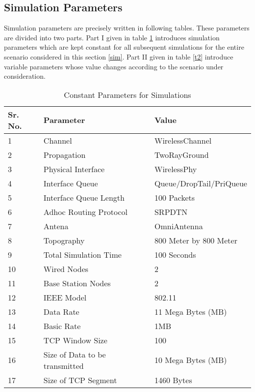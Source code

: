 \documentclass[3p,times]{elsarticle}
\begin{document}
\subsection{Simulation Parameters}\label{simpara}
Simulation parameters are precisely written in following tables. These parameters are divided into two parts. Part I given in table \ref{t1} introduces simulation parameters which are kept constant for all subsequent simulations for the entire scenario considered in this section \ref{sim}. Part II given in table \ref{t2} introduce variable parameters whose value changes according to the scenario under consideration.

\begin{table}[t]
\centering
\caption{Constant Parameters for Simulations}
\begin{tabular}{|l|l|l|}
\hline
Sr. No. & Parameter & Value \\
\hline
1 & Channel & WirelessChannel \\
2 & Propagation & TwoRayGround \\
3 & Physical Interface & WirelessPhy \\
4 & Interface Queue & Queue/DropTail/PriQueue \\
5 & Interface Queue Length & 100 Packets \\
6 & Adhoc Routing Protocol & SRPDTN \\
7 & Antena & OmniAntenna \\
8 & Topography & 800 Meter by 800 Meter\\
9 & Total Simulation Time & 100 Seconds\\
10 & Wired Nodes & 2 \\
11 & Base Station Nodes & 2 \\
12 & IEEE Model& 802.11 \\
13 & Data Rate & 11 Mega Bytes (MB)\\
14 & Basic Rate & 1MB \\
15 & TCP Window Size & 100 \\
16 & Size of Data to be transmitted & 10 Mega Bytes (MB) \\
17 & Size of TCP Segment & 1460 Bytes \\
\hline
\end{tabular}
\label{t1}
\end{table}
\end{document}
